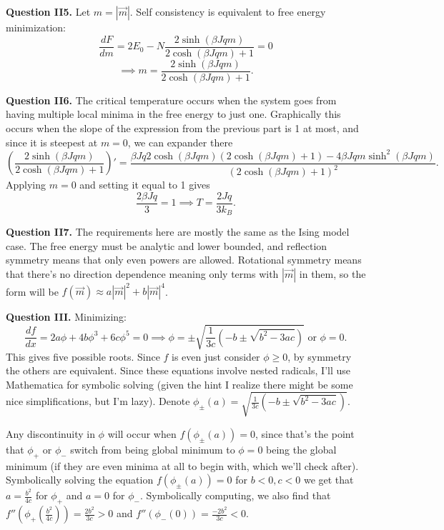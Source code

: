 \documentclass[letterpaper, reqno,11pt]{article}
\begin{document}
{\medskip\noindent\bf Question II5.} Let $m=|\vec m|$. Self consistency is equivalent to free energy minimization:
\[
    \frac{dF}{dm}=2E_0-N \frac{2 \sinh\left( \beta Jqm \right) }{2\cosh \left( \beta Jqm \right) +1}=0
\]
\[
\implies m= \frac{2\sinh\left( \beta Jqm \right)}{2\cosh \left( \beta Jqm \right) +1}
.\]

{\medskip\noindent\bf Question II6.} The critical temperature occurs when the system goes from having multiple local minima in the free energy to just one. Graphically this occurs when the slope of the expression from the previous part is 1 at most, and since it is steepest at $m=0$, we can expander there
\[
    \left( \frac{2\sinh\left( \beta Jqm \right)}{2\cosh \left( \beta Jqm \right) +1} \right)'= \frac{\beta Jq 2\cosh\left( \beta J qm \right) \left( 2\cosh\left( \beta J qm \right) +1 \right) -4\beta Jqm\sinh^2\left( \beta Jqm \right) }{\left( 2\cosh\left( \beta Jqm \right) +1 \right) ^2}
.\]
Applying $m=0$ and setting it equal to 1 gives
\[
\frac{2\beta Jq}{3}=1\implies T=\frac{2Jq}{3k_B}
.\]

{\medskip\noindent\bf Question II7.} The requirements here are mostly the same as the Ising model case. The free energy must be analytic and lower bounded, and reflection symmetry means that only even powers are allowed. Rotational symmetry means that there's no direction dependence meaning only terms with $|\vec m|$ in them, so the form will be $f(\vec m)\approx a|\vec m|^2+b|\vec m|^4$.

\newpage

{\medskip\noindent\bf Question III.} Minimizing:
\[
\frac{df}{dx}=2a\phi+4b\phi^3+6c\phi^5=0\implies \phi= \pm\sqrt{\frac{1}{3c}\left( -b\pm \sqrt{b^2-3ac} \right)} \text{ or }\phi=0
.\]
This gives five possible roots. Since $f$ is even just consider $\phi\geq 0$, by symmetry the others are equivalent. Since these equations involve nested radicals, I'll use Mathematica for symbolic solving (given the hint I realize there might be some nice simplifications, but I'm lazy). Denote $\phi_\pm(a)=\sqrt{\frac{1}{3c}\left( -b\pm \sqrt{b^2-3ac} \right)}$. 

Any discontinuity in $\phi$ will occur when $f(\phi_\pm(a))=0$, since that's the point that $\phi_+$ or $\phi_-$ switch from being global minimum to $\phi=0$ being the global minimum (if they are even minima at all to begin with, which we'll check after). Symbolically solving the equation $f(\phi_\pm(a))=0$ for $b<0,c<0$ we get that $a=\frac{b^2}{4c}$ for $\phi_+$ and $a=0$ for $\phi_-$. Symbolically computing, we also find that $f''\left(\phi_+\left(\frac{b^2}{4c}\right)\right)=\frac{2b^2}{3c}>0$ and $f''\left( \phi_-\left( 0 \right)  \right) = \frac{-2b^2}{3c}<0$.
\end{document}
